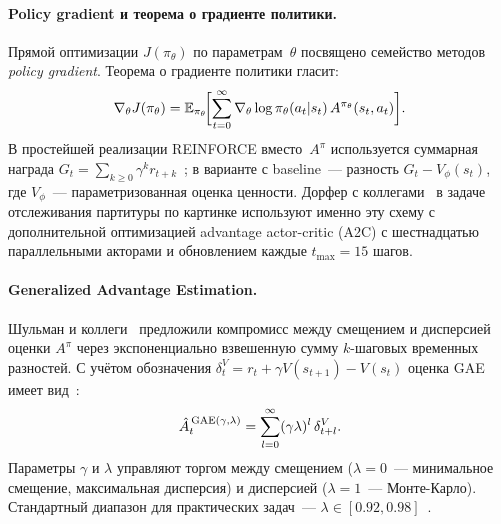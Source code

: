 \paragraph*{Policy gradient и теорема о градиенте политики.}
Прямой оптимизации $J(\pi_\theta)$ по параметрам~$\theta$
посвящено семейство методов \textit{policy gradient}.
Теорема о градиенте политики гласит:
\begin{equation}
\nabla_\theta J(\pi_\theta) = \Expect_{\pi_\theta}\!\biggl[
\sum_{t=0}^{\infty} \nabla_\theta\log\pi_\theta(a_t|s_t)\,
A^{\pi_\theta}(s_t, a_t)
\biggr].
\eqlab{policy-gradient}
\end{equation}
В простейшей реализации REINFORCE
вместо~$A^\pi$ используется суммарная награда $G_t=\sum_{k\ge 0}
\gamma^k r_{t+k}$~\cite[гл.~13]{SuttonBarto2018}; в
варианте с baseline~--- разность $G_t - V_\phi(s_t)$, где
$V_\phi$~--- параметризованная оценка ценности. Дорфер с
коллегами~\cite{Dorfer2018RL} в задаче отслеживания партитуры
по картинке используют именно эту схему с дополнительной
оптимизацией advantage actor-critic (A2C) с
шестнадцатью параллельными акторами и обновлением каждые
$t_{\max}=15$ шагов.

\paragraph*{Generalized Advantage Estimation.} Шульман и
коллеги~\cite{Schulman2016GAE} предложили компромисс между
смещением и дисперсией оценки $A^\pi$ через экспоненциально
взвешенную сумму $k$-шаговых временных
разностей. С учётом обозначения
$\delta_t^V = r_t + \gamma V(s_{t+1}) - V(s_t)$
оценка GAE имеет вид~\cite[уравн.~16]{Schulman2016GAE}:
\begin{equation}
\hat A_t^{\,\text{GAE}(\gamma,\lambda)}
= \sum_{l=0}^{\infty} (\gamma\lambda)^l \,\delta_{t+l}^V.
\eqlab{gae-def}
\end{equation}
Параметры $\gamma$ и $\lambda$ управляют торгом между смещением
($\lambda=0$~--- минимальное смещение, максимальная дисперсия)
и дисперсией ($\lambda=1$~--- Монте-Карло). Стандартный диапазон
для практических задач~--- $\lambda\in[0.92, 0.98]$~\cite{Schulman2016GAE}.

